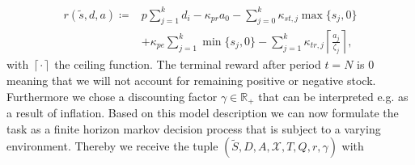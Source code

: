 \documentclass[journal, a4paper]{IEEEtran}
\theoremstyle{plain}
\theoremstyle{definition}
\begin{document}
\begin{equation}
\label{eq:one_step_reward}
	\begin{split}
		r(\tilde{s}, d, a) \coloneqq &p \sum_{j=1}^{k}d_i - \kappa_{pr} a_0 - \sum_{j=0}^{k} \kappa_{st, j} \max\{s_j, 0\} \\ 
		&+\kappa_{pe} \sum_{j=1}^{k}\min\{s_j, 0\} - \sum_{j=1}^{k} \kappa_{tr, j} \left\lceil \frac{a_j}{\zeta_j} \right\rceil,
	\end{split}
\end{equation}
with $\left\lceil \cdot \right\rceil$ the ceiling function. The terminal reward after period $t=N$ is $0$ meaning that we will not account for remaining positive or negative stock. Furthermore we chose a discounting factor $\gamma \in \mathbb{R}_+$ that can be interpreted e.g. as a result of inflation. \newline Based on this model description we can now formulate the task as a finite horizon markov decision process that is subject to a varying environment. Thereby we receive the tuple $(\tilde{S}, D, A, \mathcal{X}, T, Q, r, \gamma)$ with
\end{document}
